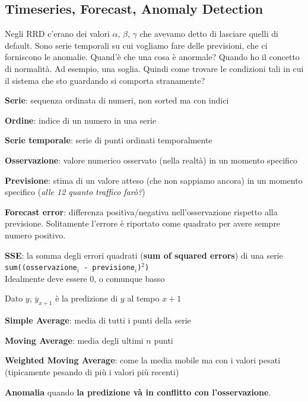 \documentclass[10pt]{book}
\begin{document}
\subsection{Timeseries, Forecast, Anomaly Detection}
Negli RRD c'erano dei valori $\alpha$, $\beta$, $\gamma$ che avevamo detto di lasciare quelli di default. Sono serie temporali su cui vogliamo fare delle previsioni, che ci forniscono le anomalie. Quand'è che una cosa è anormale? Quando ho il concetto di normalità. Ad esempio, una soglia. Quindi come trovare le condizioni tali in cui il sistema che sto guardando si comporta stranamente?\\
\begin{list}{}{\textbf{Definizioni}:}
	\item \textbf{Serie}: sequenza ordinata di numeri, non sorted ma con indici
	\item \textbf{Ordine}: indice di un numero in una serie
	\item \textbf{Serie temporale}: serie di punti ordinati temporalmente
	\item \textbf{Osservazione}: valore numerico osservato (nella realtà) in un momento specifico
	\item \textbf{Previsione}: stima di un valore atteso (che non sappiamo ancora) in un momento specifico (\textit{alle 12 quanto traffico farò?})
	\item \textbf{Forecast error}: differenza positiva/negativa nell'osservazione rispetto alla previsione. Solitamente l'errore è riportato come quadrato per avere sempre numero positivo.
	\item \textbf{SSE}: la somma degli errori quadrati (\textbf{sum of squared errors}) di una serie \texttt{sum((osservazione$_i$ - previsione$_i$)$^2$)}\\
	Idealmente deve essere 0, o comunque basso
	\item Dato $y$, $\overline{y}_{x+1}$ è la predizione di $y$ al tempo $x+1$
	\item \textbf{Simple Average}: media di tutti i punti della serie
	\item \textbf{Moving Average}: media degli ultimi $n$ punti
	\item \textbf{Weighted Moving Average}: come la media mobile ma con i valori pesati (tipicamente pesando di più i valori più recenti)
\end{list}
\textbf{Anomalia} quando \textbf{la predizione và in conflitto con l'osservazione}.
\end{document}
